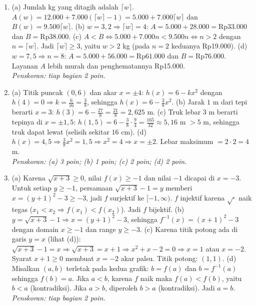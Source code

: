 \documentclass[a4paper,11pt]{article}
\begin{document}
\small\begin{enumerate}[leftmargin=2em,itemsep=3pt,topsep=2pt]
\item[\textbf{1.}] (a) Jumlah kg yang ditagih adalah $\lceil w\rceil$. $A(w)=12.000+7.000(\lceil w\rceil-1)=5.000+7.000\lceil w\rceil$ dan $B(w)=9.500\lceil w\rceil$. (b) $w=3{,}2\Rightarrow\lceil w\rceil=4$: $A=5.000+28.000=\text{Rp}33.000$ dan $B=\text{Rp}38.000$. (c) $A<B\iff5.000+7.000n<9.500n\iff n>2$ dengan $n=\lceil w\rceil$. Jadi $\lceil w\rceil\ge3$, yaitu $w>2$ kg (pada $n=2$ keduanya Rp19.000). (d) $w=7{,}5\Rightarrow n=8$: $A=5.000+56.000=\text{Rp}61.000$ dan $B=\text{Rp}76.000$. Layanan $A$ lebih murah dan penghematannya Rp15.000. \\ \textit{Penskoran: tiap bagian 2 poin.}
\item[\textbf{2.}] (a) Titik puncak $(0,6)$ dan akar $x=\pm4$: $h(x)=6-kx^2$ dengan $h(4)=0\Rightarrow k=\frac{6}{16}=\frac38$, sehingga $h(x)=6-\frac38x^2$. (b) Jarak $1$ m dari tepi berarti $x=3$: $h(3)=6-\frac{27}8=\frac{21}8=2{,}625$ m. (c) Truk lebar $3$ m berarti tepinya di $x=\pm1{,}5$: $h(1{,}5)=6-\frac38\cdot\frac94=\frac{165}{32}\approx5{,}16$ m $>5$ m, sehingga truk dapat lewat (selisih sekitar $16$ cm). (d) $h(x)=4{,}5\Rightarrow\frac38x^2=1{,}5\Rightarrow x^2=4\Rightarrow x=\pm2$. Lebar maksimum $=2\cdot2=4$ m. \\ \textit{Penskoran: (a) 3 poin; (b) 1 poin; (c) 2 poin; (d) 2 poin.}
\item[\textbf{3.}] (a) Karena $\sqrt{x+3}\ge0$, nilai $f(x)\ge-1$ dan nilai $-1$ dicapai di $x=-3$. Untuk setiap $y\ge-1$, persamaan $\sqrt{x+3}-1=y$ memberi $x=(y+1)^2-3\ge-3$, jadi $f$ surjektif ke $[-1,\infty)$. $f$ injektif karena $\sqrt{\cdot}$ naik tegas ($x_1<x_2\Rightarrow f(x_1)<f(x_2)$). Jadi $f$ bijektif. (b) $y=\sqrt{x+3}-1\Rightarrow x=(y+1)^2-3$, sehingga $f^{-1}(x)=(x+1)^2-3$ dengan domain $x\ge-1$ dan range $y\ge-3$. (c) Karena titik potong ada di garis $y=x$ (lihat (d)): $\sqrt{x+3}-1=x\Rightarrow\sqrt{x+3}=x+1\Rightarrow x^2+x-2=0\Rightarrow x=1$ atau $x=-2$. Syarat $x+1\ge0$ membuat $x=-2$ akar palsu. Titik potong: $(1,1)$. (d) Misalkan $(a,b)$ terletak pada kedua grafik: $b=f(a)$ dan $b=f^{-1}(a)$ sehingga $f(b)=a$. Jika $a<b$, karena $f$ naik maka $f(a)<f(b)$, yaitu $b<a$ (kontradiksi). Jika $a>b$, diperoleh $b>a$ (kontradiksi). Jadi $a=b$. \\ \textit{Penskoran: tiap bagian 2 poin.}

\end{enumerate}
\end{document}

